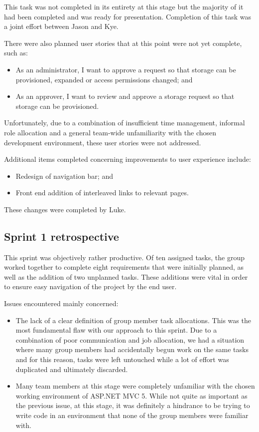 \documentclass[a4paper,titlepage,12pt]{article}
\begin{document}
This task was not completed in its entirety at this stage but the majority of
it had been completed and was ready for presentation. Completion of this task
was a joint effort between Jason and Kye.

There were also planned user stories that at this point were not yet complete,
such as:

\begin{itemize}
	\item As an administrator, I want to approve a request so that storage
	      can be provisioned, expanded or access permissions changed; and
	\item As an approver, I want to review and approve a storage request so
	      that storage can be provisioned.
\end{itemize}

Unfortunately, due to a combination of insufficient time management, informal
role allocation and a general team-wide unfamiliarity with the chosen
development environment, these user stories were not addressed.

Additional items completed concerning improvements to user experience include:

\begin{itemize}
	\item Redesign of navigation bar; and
	\item Front end addition of interleaved links to relevant pages.
\end{itemize}

These changes were completed by Luke.

\subsection{Sprint 1 retrospective}

This sprint was objectively rather productive. Of ten assigned tasks, the group
worked together to complete eight requirements that were initially planned, as
well as the addition of two unplanned tasks. These additions were vital in
order to ensure easy navigation of the project by the end user.

Issues encountered mainly concerned:

\begin{itemize}
	\item The lack of a clear definition of group member task allocations.
	      This was the most fundamental flaw with our approach to this
	      sprint. Due to a combination of poor communication and job
	      allocation, we had a situation where many group members had
	      accidentally begun work on the same tasks and for this reason,
	      tasks were left untouched while a lot of effort was duplicated
	      and ultimately discarded.
	\item Many team members at this stage were completely unfamiliar with
	      the chosen working environment of ASP.NET MVC 5.
	      While not quite as important as the previous issue, at this
	      stage, it was definitely a hindrance to be trying to write code
	      in an environment that none of the group members were familiar
	      with.
\end{itemize}
\end{document}
